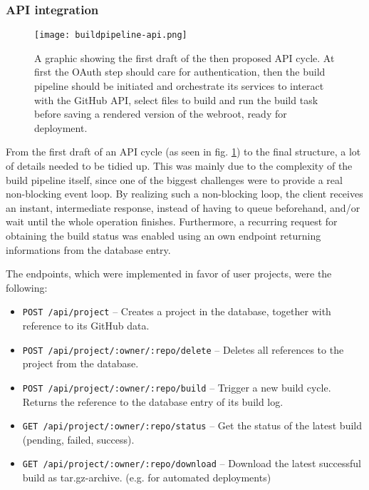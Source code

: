 \subsubsection{API integration}

\begin{figure} %
    \centering
    \texttt{[image: buildpipeline-api.png]}
    \caption{A graphic showing the first draft of the then proposed API cycle. At first the OAuth step should care for authentication, then the build pipeline should be initiated and orchestrate its services to interact with the GitHub API, select files to build and run the build task before saving a rendered version of the webroot, ready for deployment.}
    \label{fig:buildpipeline-api}
\end{figure}
%

From the first draft of an API cycle (as seen in fig. \ref{fig:buildpipeline-api}) to the final structure, a lot of details needed to be tidied up. This was mainly due to the complexity of the build pipeline itself, since one of the biggest challenges were to provide a real non-blocking event loop. By realizing such a non-blocking loop, the client receives an instant, intermediate response, instead of having to queue beforehand, and/or wait until the whole operation finishes. Furthermore, a recurring request for obtaining the build status was enabled using an own endpoint returning informations from the database entry.

The endpoints, which were implemented in favor of user projects, were the following:

\begin{itemize}
  \item \texttt{POST /api/project} -- Creates a project in the database, together with reference to its GitHub data.
  \item \texttt{POST /api/project/:owner/:repo/delete} -- Deletes all references to the project from the database.
  \item \texttt{POST /api/project/:owner/:repo/build} -- Trigger a new build cycle. Returns the reference to the database entry of its build log.
  \item \texttt{GET /api/project/:owner/:repo/status} -- Get the status of the latest build (pending, failed, success).
  \item \texttt{GET /api/project/:owner/:repo/download} -- Download the latest successful build as tar.gz-archive. (e.g. for automated deployments)
\end{itemize}
